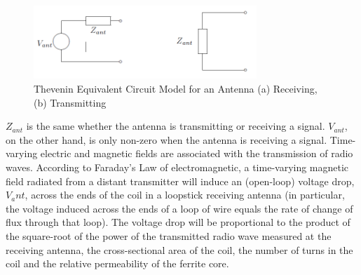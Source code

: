 \documentclass [utf8] {article}
\begin{document}
{	\begin{figure}[H]
		\begin{small}
			\begin{center}
				\includegraphics[width=0.75\textwidth]{figures/Figure6.png}
			\end{center}
			\caption{Thevenin Equivalent Circuit Model for an Antenna (a) Receiving, (b) Transmitting}
			\label{fig:thevenin}
		\end{small}
	\end{figure}
	

	$Z_{ant}$ is the same whether the antenna is transmitting or receiving a signal. $V_{ant}$, on the other hand, is only non-zero when the antenna is receiving a signal. Time-varying electric and magnetic fields are associated with the transmission of radio waves. According to Faraday’s Law of electromagnetic, a time-varying magnetic field radiated from a distant transmitter will induce an (open-loop) voltage drop, $V_ant$, across the ends of the coil in a loopstick receiving antenna (in particular, the voltage induced across the ends of a loop of wire equals the rate of change of flux through that loop). The voltage drop will be proportional to the product of the square-root of the power of the transmitted radio wave measured at the receiving antenna, the cross-sectional area of the coil, the number of turns in the coil and the relative permeability of the ferrite core.

}
\end{document}
